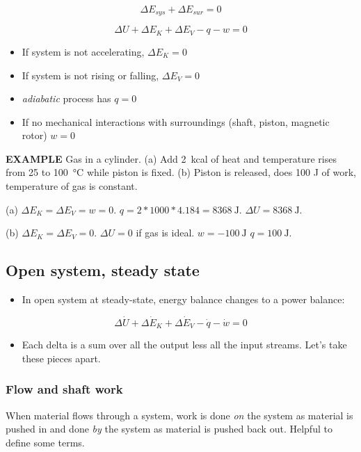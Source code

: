\documentclass[11pt]{article}
\begin{document}
\[ \Delta E_{sys} + \Delta E_{sur} = 0\]

\[ \Delta U + \Delta E_{K} + \Delta E_{V} - q - w = 0 \]

\begin{itemize}
\item If system is not accelerating, \(\Delta E_{K} = 0 \)
\item If system is not rising or falling, \(\Delta E_{V} = 0 \)
\item \emph{adiabatic} process has \( q = 0 \)
\item If no mechanical interactions with surroundings (shaft, piston, magnetic rotor) \( w = 0 \)
\end{itemize}

\begin{framed}
\noindent \textbf{EXAMPLE} Gas in a cylinder.  (a) Add 2~kcal of heat and temperature rises from 25 to \SI{100}{\celsius} while piston is fixed.  (b) Piston is released, does 100 J of work, temperature of gas is constant.

(a) \(\Delta E_{K} = \Delta E_{V} = w = 0\).  \(q = 2 * 1000 * 4.184 = 8368~\text{J}\).  \(\Delta U = 8368~\text{J}\).

(b) \(\Delta E_{K} = \Delta E_{V} = 0\).  \(\Delta U = 0 \) if gas is ideal.  \(w = -100~\text{J} \) \to \(q = 100~\text{J} \).
\end{framed}

\subsection{Open system, steady state}
\label{sec-9-3}
\begin{itemize}
\item In open system at steady-state, energy balance changes to a power balance:
\end{itemize}

\[ \Delta\dot{U} + \Delta\dot{E}_{K} + \Delta \dot{E}_{V} - \dot{q} - \dot{w} = 0 \]

\begin{itemize}
\item Each delta is a sum over all the output less all the input streams.  Let's take these pieces apart.
\end{itemize}



\subsubsection{Flow and shaft work}
\label{sec-9-3-1}
When material flows through a system, work is done \emph{on} the system as material is pushed in and done \emph{by} the system as material is pushed back out.  Helpful to define some terms.
\end{document}

